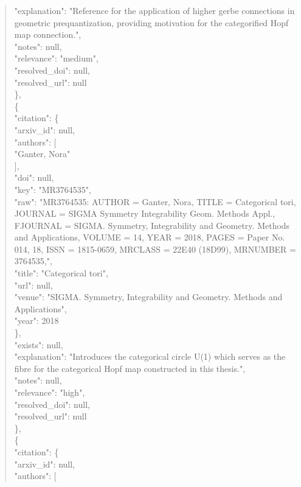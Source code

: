 \documentclass[11pt]{article}
\begin{document}
\begin{quote}
      "explanation": "Reference for the application of higher gerbe connections in geometric prequantization, providing motivation for the categorified Hopf map connection.",\\
      "notes": null,\\
      "relevance": "medium",\\
      "resolved\_doi": null,\\
      "resolved\_url": null\\
    \},\\
    \{\\
      "citation": \{\\
        "arxiv\_id": null,\\
        "authors": [\\
          "Ganter, Nora"\\
        ],\\
        "doi": null,\\
        "key": "MR3764535",\\
        "raw": "MR3764535: AUTHOR = Ganter, Nora, TITLE = Categorical tori, JOURNAL = SIGMA Symmetry Integrability Geom. Methods Appl., FJOURNAL = SIGMA. Symmetry, Integrability and Geometry. Methods and Applications, VOLUME = 14, YEAR = 2018, PAGES = Paper No. 014, 18, ISSN = 1815-0659, MRCLASS = 22E40 (18D99), MRNUMBER = 3764535,",\\
        "title": "Categorical tori",\\
        "url": null,\\
        "venue": "SIGMA. Symmetry, Integrability and Geometry. Methods and Applications",\\
        "year": 2018\\
      \},\\
      "exists": null,\\
      "explanation": "Introduces the categorical circle U(1) which serves as the fibre for the categorical Hopf map constructed in this thesis.",\\
      "notes": null,\\
      "relevance": "high",\\
      "resolved\_doi": null,\\
      "resolved\_url": null\\
    \},\\
    \{\\
      "citation": \{\\
        "arxiv\_id": null,\\
        "authors": [\\

\end{quote}
\end{document}

